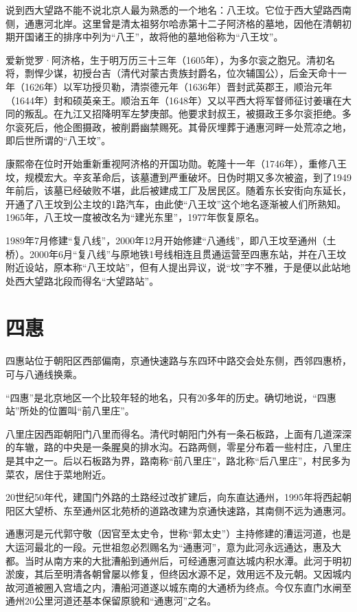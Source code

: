 说到西大望路不能不说北京人最为熟悉的一个地名：八王坟。它位于西大望路西南侧，通惠河北岸。这里曾是清太祖努尔哈赤第十二子阿济格的墓地，因他在清朝初期开国诸王的排序中列为“八王”，故将他的墓地俗称为“八王坟”。

爱新觉罗·阿济格，生于明万历三十三年（1605年），为多尔衮之胞兄。清初名将，剽悍少谋，初授台吉（清代对蒙古贵族封爵名，位次辅国公），后金天命十一年（1626年）以军功授贝勒，清崇德元年（1636年）晋封武英郡王，顺治元年（1644年）封和硕英亲王。顺治五年（1648年）又以平西大将军督师征讨姜瓖在大同的叛乱。在九江又招降明军左梦庚部。他要求封叔王，被摄政王多尔衮拒绝。多尔衮死后，他企图摄政，被削爵幽禁赐死。其骨灰埋葬于通惠河畔一处荒凉之地，即后世所谓的“八王坟”。

康熙帝在位时开始重新重视阿济格的开国功勋。乾隆十一年（1746年），重修八王坟，规模宏大。辛亥革命后，该墓遭到严重破坏。日伪时期又多次被盗，到了1949年前后，该墓已经破败不堪，此后被建成工厂及居民区。随着东长安街向东延长，开通了八王坟到公主坟的1路汽车，由此使“八王坟”这个地名逐渐被人们所熟知。1965年，八王坟一度被改名为“建光东里”，1977年恢复原名。

1989年7月修建“复八线”，2000年12月开始修建“八通线”，即八王坟至通州（土桥）。2000年6月“复八线”与原地铁1号线相连且贯通运营至四惠东站，并在八王坟附近设站，原本称“八王坟站”，但有人提出异议，说“坟”字不雅，于是便以此站地处西大望路北段而得名“大望路站”。

\section{四惠}
四惠站位于朝阳区西部偏南，京通快速路与东四环中路交会处东侧，西邻四惠桥，可与八通线换乘。

“四惠”是北京地区一个比较年轻的地名，只有20多年的历史。确切地说，“四惠站”所处的位置叫“前八里庄”。

八里庄因西距朝阳门八里而得名。清代时朝阳门外有一条石板路，上面有几道深深的车辙，路的中央是一条腥臭的排水沟。石路两侧，零星分布着一些村庄，八里庄是其中之一。后以石板路为界，路南称“前八里庄”，路北称“后八里庄”，村民多为菜农，居住于菜地附近。

20世纪50年代，建国门外路的土路经过改扩建后，向东直达通州，1995年将西起朝阳区大望桥、东至通州区北苑桥的道路改建为京通快速路，其南侧不远为通惠河。

通惠河是元代郭守敬（因官至太史令，世称“郭太史”）主持修建的漕运河道，也是大运河最北的一段。元世祖忽必烈赐名为“通惠河”，意为此河永远通达，惠及大都。当时从南方来的大批漕船到通州后，可经通惠河直达城内积水潭。此河于明初淤废，其后至明清各朝曾屡以修复，但终因水源不足，效用远不及元朝。又因城内故河道被圈入宫墙之内，漕船河道遂以城东南的大通桥为终点。今仅东直门水闸至通州20公里河道还基本保留原貌和“通惠河”之名。

